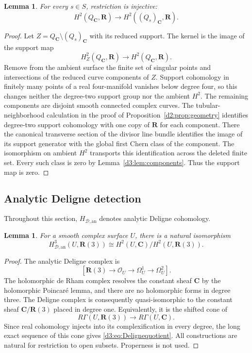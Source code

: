 \documentclass[11pt,a4paper]{amsart}
\numberwithin{equation}{section}
\newtheorem{lemma}[theorem]{Lemma}
\theoremstyle{definition}
\theoremstyle{remark}
\newcommand{\R}{\mathbf R}
\newcommand{\C}{\mathbf C}
\newcommand{\OO}{\mathcal O}
\newcommand{\HD}{H_{\mathcal D,\mathrm{an}}}
\begin{document}
\begin{lemma}\label{d3:lem:Betti}
For every $s\in S$, restriction is injective:
\[
H^2(Q_{\C},\R)\longrightarrow H^2((Q_s)_{\C},\R).
\]
\end{lemma}
\begin{proof}
Let $Z=Q_{\C}\setminus(Q_s)_{\C}$ with its reduced support. The kernel is the image of the support map
\[
H_Z^2(Q_{\C},\R)\longrightarrow H^2(Q_{\C},\R).
\]
Remove from the ambient surface the finite set of singular points and intersections of the reduced curve components of $Z$. Support cohomology in finitely many points of a real four-manifold vanishes below degree four, so this changes neither the degree-two support group nor the ambient $H^2$. The remaining components are disjoint smooth connected complex curves.
The tubular-neighborhood calculation in the proof of
Proposition~\ref{d2:prop:geometry} identifies degree-two support
cohomology with one copy of $\R$ for each component.
There the canonical transverse section of the divisor line bundle
identifies the image of its support generator with the global first
Chern class of the component. The isomorphism on ambient $H^2$
transports this identification across the deleted finite set.
Every such class is zero by Lemma~\ref{d3:lem:components}.
Thus the support map is zero.
\end{proof}

\subsection{Analytic Deligne detection}\label{d3:sec:Delignedetection}

Throughout this section, $\HD$ denotes analytic Deligne cohomology.

\begin{lemma}\label{d3:lem:Deligne}
For a smooth complex surface $U$, there is a natural isomorphism
\begin{equation}\label{d3:eq:Delignequotient}
\HD^3(U,\R(3))
\cong H^2(U,\C)/H^2(U,\R(3)).
\end{equation}
\end{lemma}
\begin{proof}
The analytic Deligne complex is
\[
[\R(3)\longrightarrow\OO_U\longrightarrow\Omega_U^1\longrightarrow\Omega_U^2].
\]
The holomorphic de Rham complex resolves the constant sheaf $\C$ by the holomorphic Poincar\'e lemma, and there are no holomorphic forms in degree three. The Deligne complex is consequently quasi-isomorphic to the constant sheaf $\C/\R(3)$ placed in degree one. Equivalently, it is the shifted cone of
\[
R\Gamma(U,\R(3))\longrightarrow R\Gamma(U,\C).
\]
Since real cohomology injects into its complexification in every degree, the long exact sequence of this cone gives \eqref{d3:eq:Delignequotient}. All constructions are natural for restriction to open subsets. Properness is not used.
\end{proof}
\end{document}
